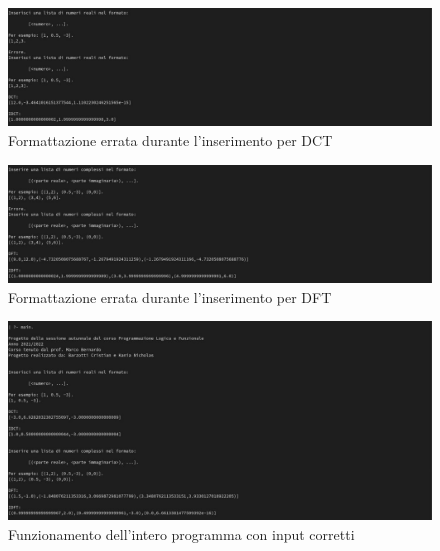 \documentclass{report}
\begin{document}
     \begin{center}
       \begin{figure}
         \includegraphics[width=\textwidth]{test_pl_7.jpg}
         \caption{Formattazione errata durante l'inserimento per DCT}
       \end{figure}
     \end{center}

     \begin{center}
       \begin{figure}
         \includegraphics[width=\textwidth]{test_pl_8.jpg}
         \caption{Formattazione errata durante l'inserimento per DFT}
       \end{figure}
     \end{center}

     \begin{center}
       \begin{figure}
         \includegraphics[width=\textwidth]{test_pl_9.jpg}
         \caption{Funzionamento dell'intero programma con input corretti}
       \end{figure}
     \end{center}
\end{document}
